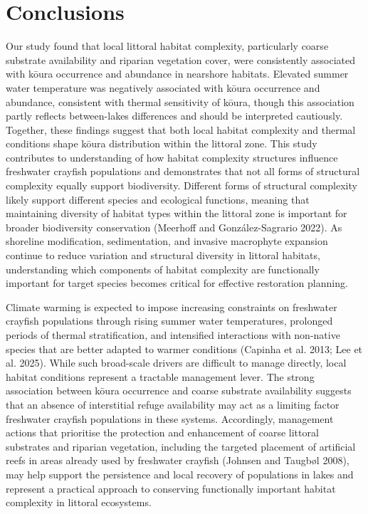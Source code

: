 \documentclass[
  12pt,
  a4paper,
]{scrbook}
\begin{document}
\section{Conclusions}\label{conclusions-1}

Our study found that local littoral habitat complexity, particularly
coarse substrate availability and riparian vegetation cover, were
consistently associated with kōura occurrence and abundance in nearshore
habitats. Elevated summer water temperature was negatively associated
with kōura occurrence and abundance, consistent with thermal sensitivity
of kōura, though this association partly reflects between-lakes
differences and should be interpreted cautiously. Together, these
findings suggest that both local habitat complexity and thermal
conditions shape kōura distribution within the littoral zone. This study
contributes to understanding of how habitat complexity structures
influence freshwater crayfish populations and demonstrates that not all
forms of structural complexity equally support biodiversity. Different
forms of structural complexity likely support different species and
ecological functions, meaning that maintaining diversity of habitat
types within the littoral zone is important for broader biodiversity
conservation (Meerhoff and González-Sagrario 2022). As shoreline
modification, sedimentation, and invasive macrophyte expansion continue
to reduce variation and structural diversity in littoral habitats,
understanding which components of habitat complexity are functionally
important for target species becomes critical for effective restoration
planning.

Climate warming is expected to impose increasing constraints on
freshwater crayfish populations through rising summer water
temperatures, prolonged periods of thermal stratification, and
intensified interactions with non-native species that are better adapted
to warmer conditions (Capinha et al. 2013; Lee et al. 2025). While such
broad-scale drivers are difficult to manage directly, local habitat
conditions represent a tractable management lever. The strong
association between kōura occurrence and coarse substrate availability
suggests that an absence of interstitial refuge availability may act as
a limiting factor freshwater crayfish populations in these systems.
Accordingly, management actions that prioritise the protection and
enhancement of coarse littoral substrates and riparian vegetation,
including the targeted placement of artificial reefs in areas already
used by freshwater crayfish (Johnsen and Taugbøl 2008), may help support
the persistence and local recovery of populations in lakes and represent
a practical approach to conserving functionally important habitat
complexity in littoral ecosystems.
\end{document}

